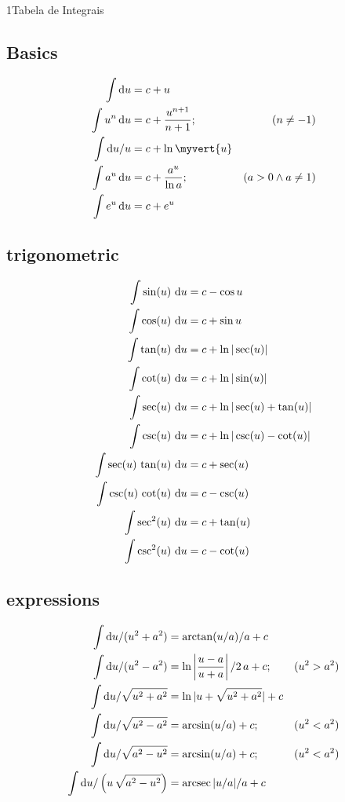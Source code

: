 \documentclass["AM3C-Slides_annotations.tex"]{subfiles}
\begin{document}
\begin{sectionBox}1{Tabela de Integrais} %
  \subsection*{Basics}
  \begin{align}
       \int       \odif{u}    &= c + u 
    \\ \int   u^n \odif{u}    &= c + \frac{u^{n+1}}{n+1} ;& (n \neq -1) 
    \\ \int \odif{u}/u        &= c + \ln\myvert{u}
    \\ \int   a^u \odif{u}    &= c + \frac{a^u}{\ln{a}} ;& (a > 0 \land a \neq 1)
    \\ \int   e^u \odif{u}    &= c + e^u
  \end{align}

  \subsection*{trigonometric}
    \begin{align}
         \int \sin(u)\,         \odif{u}&= c - \cos{u}
      \\ \int \cos(u)\,         \odif{u}&= c + \sin{u}
      \\ \int \tan(u)\,         \odif{u}&= c + \ln|\sec(u)          |
      \\ \int \cot(u)\,         \odif{u}&= c + \ln|\sin(u)          |
      \\ \int \sec(u)\,         \odif{u}&= c + \ln|\sec(u) + \tan(u)|
      \\ \int \csc(u)\,         \odif{u}&= c + \ln|\csc(u) - \cot(u)|
      \\ \int \sec(u)\,\tan(u)\,\odif{u}&= c + \sec(u)
      \\ \int \csc(u)\,\cot(u)\,\odif{u}&= c - \csc(u)
      \\ \int \sec^2(u)\,       \odif{u}&= c + \tan(u)
      \\ \int \csc^2(u)\,       \odif{u}&= c - \cot(u)
    \end{align}
  \subsection*{expressions}
  \begin{align}
       \int \odif{u}/     (u^2 + a^2) &= \arctan(u/a)/a + c 
    \\ \int \odif{u}/     (u^2 - a^2) &= \ln\left|\frac{u-a}{u+a}\right|/2\,a + c ;& (u^2 > a^2) 
    \\ \int \odif{u}/    \sqrt{u^2 + a^2} &= \ln{|u + \sqrt{u^2+a^2}|} + c 
    \\ \int \odif{u}/    \sqrt{u^2 - a^2} &= \arcsin(u/a) + c ;& (u^2 < a^2) 
    \\ \int \odif{u}/    \sqrt{a^2 - u^2} &= \arcsin(u/a) + c ;& (u^2 < a^2) 
    \\ \int \odif{u}/\left(u\,\sqrt{a^2 - u^2}\right)&= \arcsec|u/a|/a + c  
  \end{align}


\end{sectionBox}
\end{document}
